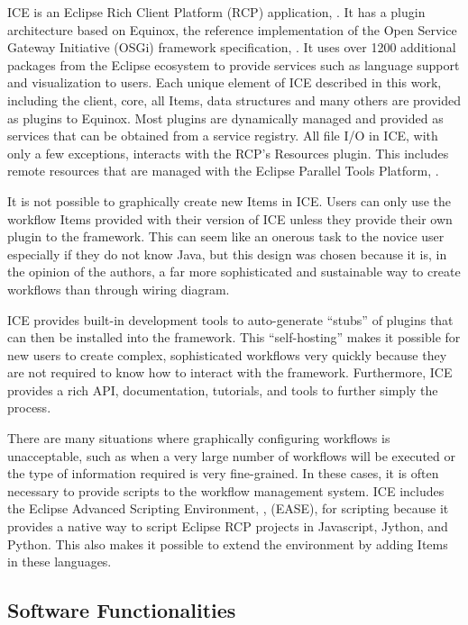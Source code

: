 ICE is an Eclipse Rich Client Platform (RCP) application,
\cite{mcaffer_eclipse_2010}. It has a plugin architecture based on Equinox, the
reference implementation of the Open Service Gateway Initiative (OSGi) framework specification, \cite{mcaffer_osgi_2010}. It uses over 1200 additional
packages from the Eclipse ecosystem to provide services such as language
support and visualization to users. Each unique element of ICE described
in this work, including the client, core, all Items, data structures and
many others are provided as plugins to Equinox. Most plugins are
dynamically managed and provided as services that can be obtained from a
service registry. All file I/O in ICE, with only a few exceptions,
interacts with the RCP's Resources plugin. This includes remote
resources that are managed with the Eclipse Parallel Tools Platform,
\cite{tibbitts_integrated_2009}.

It is not possible to graphically create new Items in ICE. Users can
only use the workflow Items provided with their version of ICE unless
they provide their own plugin to the framework. This can seem like an
onerous task to the novice user especially if they do not know Java, but
this design was chosen because it is, in the opinion of the authors, a
far more sophisticated and sustainable way to create workflows than
through wiring diagram.

ICE provides built-in development tools to auto-generate ``stubs'' of
plugins that can then be installed into the framework. This
``self-hosting'' makes it possible for new users to create complex,
sophisticated workflows very quickly because they are not required to
know how to interact with the framework. Furthermore, ICE provides a
rich API, documentation, tutorials, and tools to further simply the
process.

There are many situations where graphically configuring workflows is
unacceptable, such as when a very large number of workflows will be
executed or the type of information required is very fine-grained. In
these cases, it is often necessary to provide scripts to the workflow
management system. ICE includes the Eclipse Advanced Scripting
Environment, \cite{pontesegger_eclipse_2015}, (EASE), for scripting because it
provides a native way to script Eclipse RCP projects in Javascript,
Jython, and Python. This also makes it possible to extend the
environment by adding Items in these languages.

\subsection{Software Functionalities}\label{software-functionalities}

